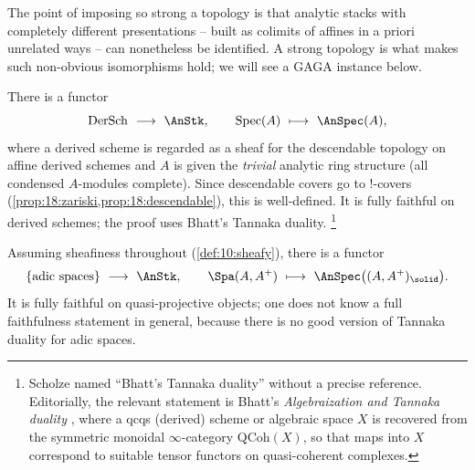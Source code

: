 The point of imposing so strong a topology is that analytic stacks with
completely different presentations -- built as colimits of affines in a priori
unrelated ways -- can nonetheless be identified. A strong topology is what makes
such non-obvious isomorphisms hold; we will see a GAGA instance below.

\begin{example}
\label{ex:19:derived-schemes}
There is a functor
\begin{equation}
\label{eq:19:dersch-to-anstk}
\operatorname{DerSch}\ \longrightarrow\ \AnStk,\qquad
\operatorname{Spec}(A)\ \longmapsto\ \AnSpec(A),
\end{equation}
where a derived scheme is regarded as a sheaf for the descendable topology on
affine derived schemes and $A$ is given the \emph{trivial} analytic ring
structure (all condensed $A$-modules complete). Since descendable covers go to
$!$-covers (\cref{prop:18:zariski,prop:18:descendable}), this is well-defined. It is fully
faithful on derived schemes; the proof uses Bhatt's Tannaka duality.%
\footnote{Scholze named ``Bhatt's Tannaka duality'' without a precise reference.
Editorially, the relevant statement is Bhatt's \emph{Algebraization and Tannaka
duality} \cite{bhatt2014algebraizationtannakaduality}, where a
qcqs (derived) scheme or algebraic space $X$ is recovered from the symmetric
monoidal $\infty$-category $\mathrm{QCoh}(X)$, so that maps into $X$ correspond
to suitable tensor functors on quasi-coherent complexes.}
\end{example}

\begin{example}
\label{ex:19:adic}
Assuming sheafiness throughout (\cref{def:10:sheafy}), there is a functor
\begin{equation}
\label{eq:19:adic-to-anstk}
\{\text{adic spaces}\}\ \longrightarrow\ \AnStk,\qquad
\Spa(A,A^+)\ \longmapsto\ \AnSpec\bigl((A,A^+)_\solid\bigr).
\end{equation}
It is fully faithful on quasi-projective objects; one does not know a
full faithfulness statement in general, because there is no good version of
Tannaka duality for adic spaces.
\end{example}

